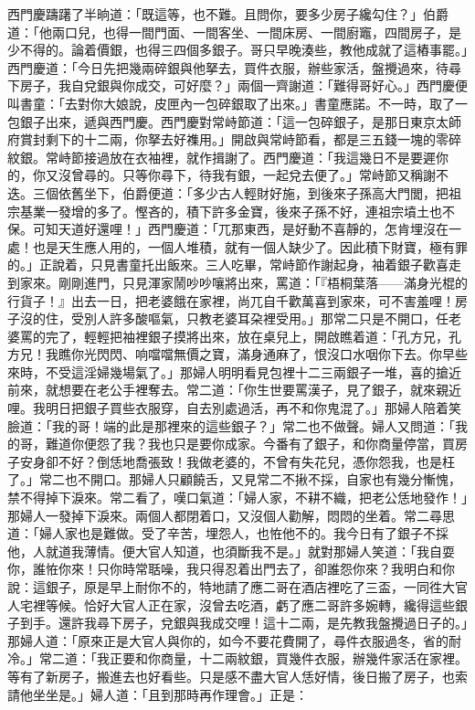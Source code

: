西門慶躊躇了半晌道：「既這等，也不難。且問你，要多少房子纔勾住？」伯爵道：「他兩口兒，也得一間門面、一間客坐、一間床房、一間廚竈，四間房子，是少不得的。論着價銀，也得三四個多銀子。哥只早晚湊些，教他成就了這樁事罷。」西門慶道：「今日先把幾兩碎銀與他拏去，買件衣服，辦些家活，盤攪過來，待尋下房子，我自兌銀與你成交，可好麼？」兩個一齊謝道：「難得哥好心。」西門慶便叫書童：「去對你大娘說，皮匣內一包碎銀取了出來。」書童應諾。不一時，取了一包銀子出來，遞與西門慶。西門慶對常峙節道：「這一包碎銀子，是那日東京太師府賞封剩下的十二兩，你拏去好襍用。」開啟與常峙節看，都是三五錢一塊的零碎紋銀。常峙節接過放在衣袖裡，就作揖謝了。西門慶道：「我這幾日不是要遲你的，你又沒曾尋的。只等你尋下，待我有銀，一起兌去便了。」常峙節又稱謝不迭。{}三個依舊坐下，伯爵便道：「多少古人輕財好施，到後來子孫高大門閭，把祖宗基業一發增的多了。慳吝的，積下許多金寶，後來子孫不好，連祖宗墳土也不保。可知天道好還哩！」西門慶道：「兀那東西，是好動不喜靜的，怎肯埋沒在一處！也是天生應人用的，一個人堆積，就有一個人缺少了。因此積下財寶，極有罪的。」{}正說着，只見書童托出飯來。三人吃畢，常峙節作謝起身，袖着銀子歡喜走到家來。剛剛進門，只見渾家鬧吵吵嚷將出來，罵道：「『梧桐葉落——滿身光棍的行貨子！』出去一日，把老婆餓在家裡，尚兀自千歡萬喜到家來，可不害羞哩！房子沒的住，受別人許多酸嘔氣，只教老婆耳朶裡受用。」那常二只是不開口，{}任老婆罵的完了，輕輕把袖裡銀子摸將出來，放在桌兒上，開啟瞧着道：「孔方兄，孔方兄！我瞧你光閃閃、响噹噹無價之寶，滿身通麻了，恨沒口水咽你下去。你早些來時，不受這淫婦幾場氣了。」{}那婦人明明看見包裡十二三兩銀子一堆，喜的搶近前來，就想要在老公手裡奪去。{}常二道：「你生世要罵漢子，見了銀子，就來親近哩。我明日把銀子買些衣服穿，自去別處過活，再不和你鬼混了。」那婦人陪着笑臉道：「我的哥！端的此是那裡來的這些銀子？」常二也不做聲。婦人又問道：「我的哥，難道你便怨了我？我也只是要你成家。今番有了銀子，和你商量停當，買房子安身卻不好？倒恁地喬張致！我做老婆的，不曾有失花兒，憑你怨我，也是枉了。」常二也不開口。那婦人只顧饒舌，又見常二不揪不採，自家也有幾分慚愧，禁不得掉下淚來。常二看了，嘆口氣道：「婦人家，不耕不織，把老公恁地發作！」那婦人一發掉下淚來。{}兩個人都閉着口，又沒個人勸解，悶悶的坐着。{}常二尋思道：「婦人家也是難做。受了辛苦，埋怨人，也恠他不的。我今日有了銀子不採他，人就道我薄情。{}便大官人知道，也須斷我不是。」就對那婦人笑道：「我自耍你，誰恠你來！只你時常聒噪，我只得忍着出門去了，卻誰怨你來？我明白和你說：這銀子，原是早上耐你不的，特地請了應二哥在酒店裡吃了三盃，一同徃大官人宅裡等候。恰好大官人正在家，沒曾去吃酒，虧了應二哥許多婉轉，纔得這些銀子到手。還許我尋下房子，兌銀與我成交哩！這十二兩，是先教我盤攪過日子的。」那婦人道：「原來正是大官人與你的，如今不要花費開了，尋件衣服過冬，省的耐冷。」常二道：「我正要和你商量，十二兩紋銀，買幾件衣服，辦幾件家活在家裡。等有了新房子，搬進去也好看些。只是感不盡大官人恁好情，{}後日搬了房子，也索請他坐坐是。」婦人道：「且到那時再作理會。」正是：

